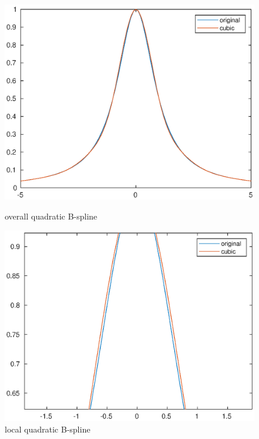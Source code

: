 \documentclass[twoside,a4paper]{article}
\begin{document}
\begin{figure}[h]
\includegraphics[width=6in]{./figure/cubic_overall.eps}
\caption{overall quadratic B-spline}
\includegraphics[width=6in]{./figure/cubic_local.eps}
\caption{local quadratic B-spline}
\end{figure}
\end{document}
